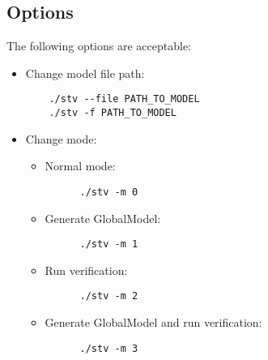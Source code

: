 \documentclass[12pt]{article}
\begin{document}
\subsection{Options}
The following options are acceptable:
\begin{itemize}
  \item Change model file path:
  \begin{lstlisting}
    ./stv --file PATH_TO_MODEL 
    ./stv -f PATH_TO_MODEL 
  \end{lstlisting}
  \item Change mode:
  \begin{itemize}
    \item Normal mode:
    \begin{lstlisting}
      ./stv -m 0
    \end{lstlisting}
    \item Generate GlobalModel:
    \begin{lstlisting}
      ./stv -m 1
    \end{lstlisting}
    \item Run verification:
    \begin{lstlisting}
      ./stv -m 2
    \end{lstlisting}
    \item Generate GlobalModel and run verification:
    \begin{lstlisting}
      ./stv -m 3
    \end{lstlisting}
  \end{itemize}
\end{itemize}
\end{document}
